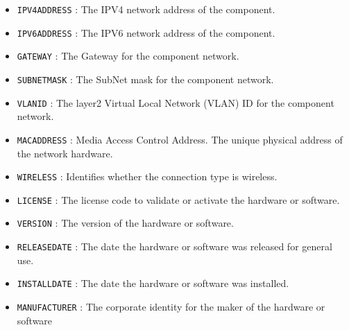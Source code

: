 \begin{itemize}
\item \texttt{IPV4\textunderscore ADDRESS} : The IPV4 network address of the component. 

\item \texttt{IPV6\textunderscore ADDRESS} : The IPV6 network address of the component. 

\item \texttt{GATEWAY} : The Gateway for the component network. 

\item \texttt{SUBNET\textunderscore MASK} : The SubNet mask for the component network.
 

\item \texttt{VLAN\textunderscore ID} : The layer2 Virtual Local Network (VLAN) ID for the component network. 

\item \texttt{MAC\textunderscore ADDRESS} : Media Access Control Address. The unique physical address of the network hardware. 

\item \texttt{WIRELESS} : Identifies whether the connection type is wireless. 

\item \texttt{LICENSE} : The license code to validate or activate the hardware or software. 

\item \texttt{VERSION} : The version of the hardware or software.
 

\item \texttt{RELEASE\textunderscore DATE} : The date the hardware or software was released for general use. 

\item \texttt{INSTALL\textunderscore DATE} : The date the hardware or software was installed. 

\item \texttt{MANUFACTURER} : The corporate identity for the maker of the hardware or software 

\end{itemize}

\FloatBarrier
